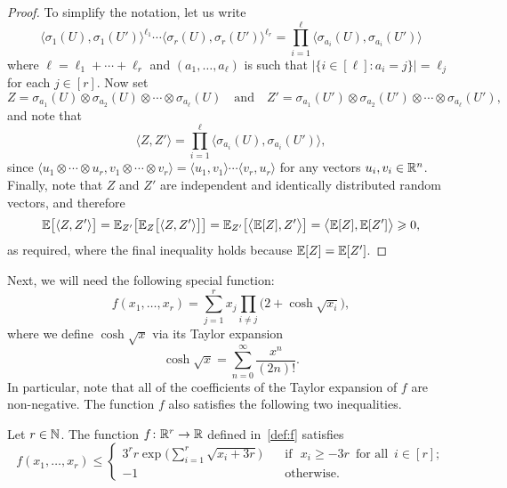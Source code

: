 \begin{proof}
To simplify the notation, let us write 
$$\big\langle \sigma_1(U),\sigma_1(U') \big\rangle^{\ell_1} \cdots \big\langle \sigma_r(U), \sigma_r(U') \big\rangle^{\ell_r} = \prod_{i = 1}^\ell \big\langle \sigma_{a_i}(U), \sigma_{a_i}(U') \big\rangle $$
where $\ell = \ell_1 + \cdots + \ell_r$ and $(a_1,\dots,a_\ell)$ is such that $\big| \big\{ i \in [\ell] : a_i = j \big\} \big| = \ell_j$ for each $j \in [r]$. Now set
$$Z = \sigma_{a_1}(U) \otimes \sigma_{a_2}(U) \otimes \cdots \otimes \sigma_{a_\ell}(U) \quad \text{and} \quad Z' = \sigma_{a_1}(U') \otimes \sigma_{a_2}(U') \otimes \cdots \otimes \sigma_{a_\ell}(U'),$$ 
and note that 
$$\big\langle Z, Z' \big\rangle = \prod_{i = 1}^\ell \big\langle \sigma_{a_i}(U), \sigma_{a_i}(U') \big\rangle,$$ 
since $\langle u_1 \otimes \cdots \otimes u_r, v_1 \otimes \cdots \otimes v_r \rangle = \langle u_1, v_1 \rangle  \cdots \langle v_r , u_r \rangle $ for any vectors $u_i,v_i \in \mathbb{R}^n$. Finally, note that $Z$ and $Z'$ are independent and identically distributed random vectors, and therefore
$$\mathbb{E} \big[ \langle Z, Z' \rangle \big] = \mathbb{E}_{Z'} \big[ \mathbb{E}_Z \big[ \langle Z, Z' \rangle \big] \big] = 
\mathbb{E}_{Z'} \big[ \big\langle \mathbb{E}[Z], Z' \big\rangle \big] = \big\langle \mathbb{E}[Z], \mathbb{E}[Z'] \big\rangle \geqslant 0,$$ 
as required, where the final inequality holds because $\mathbb{E}[Z] = \mathbb{E}[Z']$. 
\end{proof}

Next, we will need the following special function: 
\begin{equation}\label{def:f}
f(x_1,\dots,x_r) = \sum_{j = 1}^r x_j \prod_{i \ne j} \big( 2 + \cosh\sqrt{x_i} \big),
\end{equation}
where we define $\cosh \sqrt{x}$ via its Taylor expansion
$$\cosh\sqrt{x} = \sum_{n = 0}^\infty \frac{x^n}{(2n)!}.$$ 
In particular, note that all of the coefficients of the Taylor expansion of $f$ are non-negative. The function $f$ also satisfies the following two inequalities. 

\begin{lemma}\label{lem:special:function}
Let $r \in \mathbb{N}$. The function $f \colon \mathbb{R}^r \rightarrow \mathbb{R}$ defined in~\eqref{def:f} satisfies
$$
f(x_1,\dots,x_r) \le \left\{\begin{array}{cl}
3^r r \exp\bigg( \displaystyle\sum_{i = 1}^r \sqrt{ x_i + 3r } \bigg) \quad & \text{if } \,\, x_i \ge - 3r \,\text{ for all }\, i \in [r];\\[+3ex]
-1 & \text{otherwise.} 
\end{array} \right.
$$
\end{lemma}

